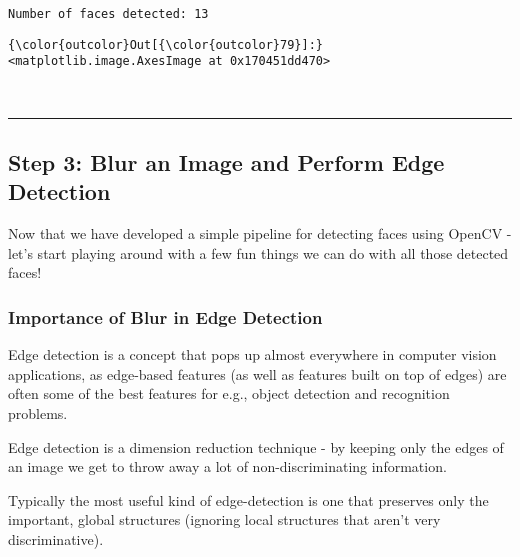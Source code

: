 \documentclass[11pt]{article}
\begin{document}
    \begin{Verbatim}[commandchars=\\\{\}]
Number of faces detected: 13

    \end{Verbatim}

\begin{Verbatim}[commandchars=\\\{\}]
{\color{outcolor}Out[{\color{outcolor}79}]:} <matplotlib.image.AxesImage at 0x170451dd470>
\end{Verbatim}
            
    \begin{center}
    \end{center}
    { \hspace*{\fill} \\}
    
    \begin{center}\rule{0.5\linewidth}{\linethickness}\end{center}

\subsection{Step 3: Blur an Image and Perform Edge
Detection}\label{step-3-blur-an-image-and-perform-edge-detection}

    Now that we have developed a simple pipeline for detecting faces using
OpenCV - let's start playing around with a few fun things we can do with
all those detected faces!

    \subsubsection{Importance of Blur in Edge
Detection}\label{importance-of-blur-in-edge-detection}

Edge detection is a concept that pops up almost everywhere in computer
vision applications, as edge-based features (as well as features built
on top of edges) are often some of the best features for e.g., object
detection and recognition problems.

Edge detection is a dimension reduction technique - by keeping only the
edges of an image we get to throw away a lot of non-discriminating
information.

Typically the most useful kind of edge-detection is one that preserves
only the important, global structures (ignoring local structures that
aren't very discriminative).
\end{document}
